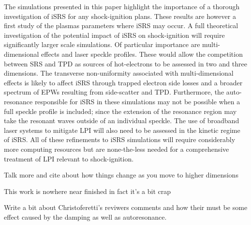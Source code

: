 The simulations presented in this paper highlight the importance of a thorough investigation of iSRS for any shock-ignition
plans. These results are however a first study of the plasmas parameters where iSRS may occur. A full theoretical
investigation of the potential impact of iSRS on shock-ignition will require significantly larger scale simulations. Of
particular importance are multi-dimensional effects and laser speckle profiles. These would allow the competition between
SRS and TPD as sources of hot-electrons to be assessed in two and three dimensions. The transverse non-uniformity associated with
multi-dimensional effects is likely to affect iSRS through trapped electron side losses and a broader spectrum of EPWs
resulting from side-scatter and TPD.
Furthermore, the auto-resonance responsible for iSRS in these simulations may not be
possible when a full speckle profile is included; since the extension of the resonance region may take the
resonant waves outside of an individual speckle. The use of broadband
laser systems to mitigate LPI will also need to be assessed
in the kinetic regime of iSRS.
All of these refinements to iSRS simulations will require considerably more
computing resources but are none-the-less needed for a comprehensive treatment of LPI relevant
to shock-ignition.

Talk more and cite about how things change as you move to higher dimensions

This work is nowhere near finished in fact it's a bit crap

Write a bit about Christoferetti's reviwers comments and how their must be some effect caused by the damping as well as autoresonance.

%
